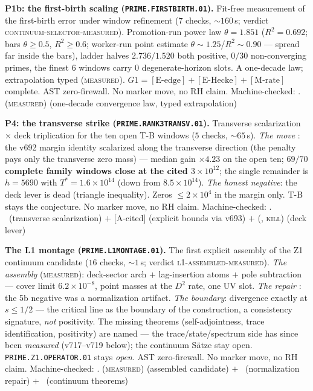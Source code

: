 \documentclass[11pt,a4paper]{article}
\theoremstyle{definition}
\begin{document}
\par\smallskip\noindent\textbf{P1b: the first-birth scaling
(\texttt{PRIME.FIRSTBIRTH.01}).}
Fit-free measurement of the first-birth error under window
refinement ($7$ checks, ${\sim}160$\,s; verdict
\textsc{continuum-selector-measured}).  Promotion-run power law
$\theta=1.851$ ($R^2=0.692$; bars $\theta\ge0.5$, $R^2\ge0.6$;
worker-run point estimate $\theta\sim1.25$/$R^2\sim0.90$ --- spread
far inside the bars), ladder halves $2.736/1.520$ both positive,
$0/30$ non-converging primes, the finest $6$ windows carry $0$
degenerate-horizon slots.  A one-decade law; extrapolation typed
(\textsc{measured}).  $G1=[\mathrm{E\mbox{-}edge}]+
[\mathrm{E\mbox{-}Hecke}]+[\mathrm{M\mbox{-}rate}]$ complete.  AST
zero-firewall.  No marker move, no RH claim.
Machine-checked: .
(\textsc{measured}) (one-decade convergence law, typed
extrapolation)
\par\smallskip

\par\smallskip\noindent\textbf{P4: the transverse strike
(\texttt{PRIME.RANK3TRANSV.01}).}
Transverse scalarization $\times$ deck triplication for the ten open
T-B windows ($5$ checks, ${\sim}65$\,s).  \emph{The move} \mE: the
v692 margin identity scalarized along the transverse direction (the
penalty pays only the transverse zero mass) --- median gain
$\times4.23$ on the open ten; \textbf{$69/70$ complete family
windows close at the cited $3\times10^{12}$}; the single remainder
is $h=5690$ with $T^*=1.6\times10^{14}$ (down from
$8.5\times10^{14}$).  \emph{The honest negative}: the deck lever is
dead (triangle inequality).  Zeros $\le2\times10^4$ in the margin
only.  T-B stays the conjecture.  No marker move, no RH claim.
Machine-checked: .
\mE\ (transverse scalarization) $+$ [A-cited] (explicit bounds via
v693) $+$ (\mE, \textsc{kill}) (deck lever)
\par\smallskip

\par\smallskip\noindent\textbf{The L1 montage
(\texttt{PRIME.L1MONTAGE.01}).}
The first explicit assembly of the Z1 continuum candidate ($16$
checks, ${\sim}1$\,s; verdict \textsc{l1-assembled-measured}).
\emph{The assembly} (\textsc{measured}): deck-sector arch $+$
lag-insertion atoms $+$ pole subtraction --- cover limit
$6.2\times10^{-8}$, point masses at the $D^2$ rate, one UV slot.
\emph{The repair} \mE: the 5b negative was a normalization artifact.
\emph{The boundary}: divergence exactly at $s\le1/2$ --- the
critical line as the boundary of the construction, a consistency
signature, \emph{not} positivity.  The missing theorems
(self-adjointness, trace identification, positivity) are named ---
the trace/state/spectrum side has since been \emph{measured}
(v717--v719 below); the continuum S\"atze stay open.
\texttt{PRIME.Z1.OPERATOR.01} stays \emph{open}.  AST zero-firewall.
No marker move, no RH claim.
Machine-checked: .
(\textsc{measured}) (assembled candidate) $+$ \mE\ (normalization
repair) $+$ \mO\ (continuum theorems)
\par\smallskip
\end{document}
